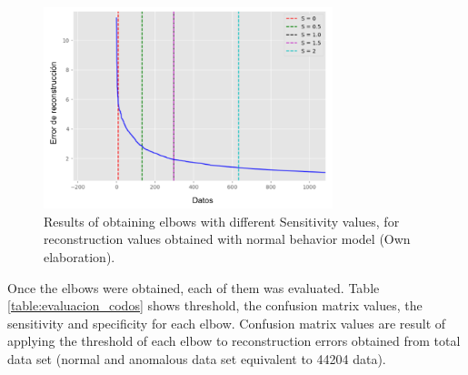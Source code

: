 \begin{figure}[H]
        \centering
            \includegraphics[width=0.75\textwidth, frame]{imagenes/Cap5/zoom_codos}
        \caption{Results of obtaining elbows with different Sensitivity values, for reconstruction values obtained with normal behavior model (Own elaboration).}
		\label{fig:zoom_codos}
\end{figure}

Once the elbows were obtained, each of them was evaluated. Table \ref{table:evaluacion_codos} shows threshold, the confusion matrix values, the sensitivity and specificity for each elbow. Confusion matrix values are result of applying the threshold of each elbow to reconstruction errors obtained from total data set (normal and anomalous data set equivalent to 44204 data).

